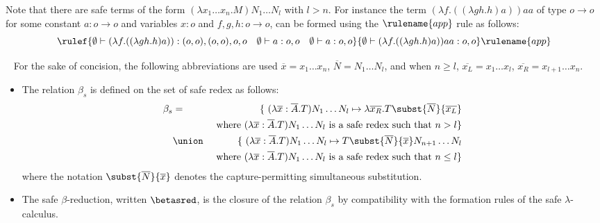 Note that there are safe terms of the form $(\lambda x_1 \ldots x_n
. M) N_1 \ldots N_l$ with $l>n$. For instance the term $ (\lambda f
. ((\lambda g h . h) a) ) a a$ of type $o \rightarrow o$ for some
constant $a:o \rightarrow o$ and variables $x : o$ and $f,g,h:o
\rightarrow o$, can be formed using the $\rulename{app}$ rule as
follows:
$$ \rulef{
    \emptyset \vdash (\lambda f . ((\lambda g h . h) a) ) : (o,o),(o,o),o,o
        \quad \emptyset \vdash a : o,o
        \quad \emptyset \vdash a : o,o
    }
    {
       \emptyset \vdash (\lambda f . ((\lambda g h . h) a) ) a a : o,o
    } \rulename{app}
$$


\begin{definition} \
\label{dfn:safereduction} For the sake of concision, the following
abbreviations are used $\overline{x} = x_1 \ldots x_n$,
$\overline{N} = N_1 \ldots N_l$, and when $n\geq l$, $\overline{x_L}
= x_1 \ldots x_l$, $\overline{x_R} = x_{l+1} \ldots x_n$.
\begin{itemize}
\item The relation $\beta_s$ is defined on the set of safe redex as follows:
\begin{eqnarray*}
\beta_s &=&
\{  \ (\lambda \overline{x} : \overline{A} . T) N_1 \ldots N_l \mapsto \lambda \overline{x_R}. T\subst{\overline{N}}{\overline{x_L}}  \\
&& \mbox{ where $(\lambda \overline{x} : \overline{A} . T) N_1 \ldots N_l$ is a safe redex such that $n> l$}
\} \\
&\union&
\{ \ (\lambda \overline{x} : \overline{A} . T) N_1 \ldots N_l \mapsto T\subst{\overline{N}}{\overline{x}} N_{n+1} \ldots N_l  \\
&& \mbox{ where $(\lambda \overline{x} : \overline{A} . T) N_1 \ldots N_l$ is a safe redex such that $n\leq l$}
\}
\end{eqnarray*}
where the notation $\subst{\overline{N}}{\overline{x}}$ denotes the capture-permitting simultaneous substitution.

\item
The safe $\beta$-reduction, written $\betasred$, is the closure of
the relation $\beta_s$ by compatibility with the formation rules of
the safe $\lambda$-calculus.
\end{itemize}
\end{definition}



